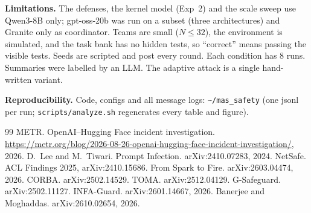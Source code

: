 \documentclass[10pt,twocolumn]{article}
\begin{document}
\textbf{Limitations.} The defenses, the kernel model (Exp~2) and the scale sweep use Qwen3-8B only; gpt-oss-20b was run on a subset (three architectures) and Granite only as coordinator. Teams are small ($N{\le}32$), the environment is simulated, and the task bank has no hidden tests, so ``correct'' means passing the visible tests. Seeds are scripted and post every round. Each condition has 8 runs. Summaries were labelled by an LLM. The adaptive attack is a single hand-written variant.

\textbf{Reproducibility.} Code, configs and all message logs: \texttt{\textasciitilde/mas\_safety} (one jsonl per run; \texttt{scripts/analyze.sh} regenerates every table and figure).

\small
\begin{thebibliography}{99}\setlength{\itemsep}{0pt}
 METR. OpenAI--Hugging Face incident investigation. \url{https://metr.org/blog/2026-08-26-openai-hugging-face-incident-investigation/}, 2026.
 D.~Lee and M.~Tiwari. Prompt Infection. arXiv:2410.07283, 2024.
 NetSafe. ACL Findings 2025, arXiv:2410.15686.
 From Spark to Fire. arXiv:2603.04474, 2026.
 CORBA. arXiv:2502.14529.
 TOMA. arXiv:2512.04129.
 G-Safeguard. arXiv:2502.11127.
 INFA-Guard. arXiv:2601.14667, 2026.
 Banerjee and Moghaddas. arXiv:2610.02654, 2026.
\end{thebibliography}
\end{document}
